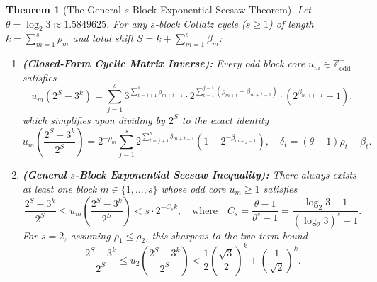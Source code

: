 \documentclass[11pt, a4paper]{amsart}
\newtheorem{theorem}{Theorem}[section]
\theoremstyle{definition}
\newcommand{\Z}{\mathbb{Z}}
\begin{document}
\begin{theorem}[The General $s$-Block Exponential Seesaw Theorem]\label{thm:s_block_seesaw}
Let $\theta = \log_2 3 \approx 1.5849625$. For any $s$-block Collatz cycle ($s \ge 1$) of length $k = \sum_{m=1}^s \rho_m$ and total shift $S = k + \sum_{m=1}^s \beta_m$:
\begin{enumerate}
    \item \textbf{(Closed-Form Cyclic Matrix Inverse):} Every odd block core $u_m \in \Z_{\text{odd}}^+$ satisfies
    \begin{equation}\label{eq:um_closed}
    u_m (2^S - 3^k) = \sum_{j=1}^s 3^{\sum_{t=j+1}^s \rho_{m+t-1}} \cdot 2^{\sum_{t=1}^{j-1}(\rho_{m+t} + \beta_{m+t-1})} \cdot \left(2^{\beta_{m+j-1}} - 1\right),
    \end{equation}
    which simplifies upon dividing by $2^S$ to the exact identity
    \begin{equation}\label{eq:um_exact_delta}
    u_m \left(\frac{2^S - 3^k}{2^S}\right) = 2^{-\rho_m} \sum_{j=1}^s 2^{\sum_{t=j+1}^s \delta_{m+t-1}} \left(1 - 2^{-\beta_{m+j-1}}\right), \quad \delta_t = (\theta - 1)\rho_t - \beta_t.
    \end{equation}
    \item \textbf{(General $s$-Block Exponential Seesaw Inequality):} There always exists at least one block $m \in \{1, \dots, s\}$ whose odd core $u_m \ge 1$ satisfies
    \begin{equation}\label{eq:s_seesaw}
    \frac{2^S - 3^k}{2^S} \le u_m \left(\frac{2^S - 3^k}{2^S}\right) < s \cdot 2^{-C_s k}, \quad \text{where} \quad C_s = \frac{\theta - 1}{\theta^s - 1} = \frac{\log_2 3 - 1}{(\log_2 3)^s - 1}.
    \end{equation}
    For $s = 2$, assuming $\rho_1 \le \rho_2$, this sharpens to the two-term bound
    \begin{equation}\label{eq:2_seesaw}
    \frac{2^S - 3^k}{2^S} \le u_2 \left(\frac{2^S - 3^k}{2^S}\right) < \frac{1}{2}\left(\frac{\sqrt{3}}{2}\right)^k + \left(\frac{1}{\sqrt{2}}\right)^k.
    \end{equation}
\end{enumerate}
\end{theorem}
\end{document}
